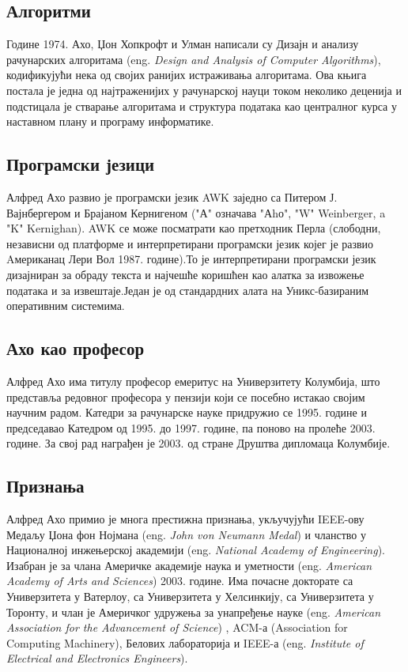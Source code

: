 \documentclass[a4paper]{article}
\begin{document}
\subsection{Алгоритми}
\label{subsec:podnaslov4}
Године 1974. Ахо, Џон Хопкрофт и Улман написали су Дизајн и анализу рачунарских алгоритама (eng. \emph{Design and Analysis of Computer Algorithms}), кодификујући нека од својих ранијих истраживања алгоритама. Ова књига постала је једна од најтраженијих у рачунарској науци током неколико деценија и подстицала је стварање алгоритама и структура података као централног курса у наставном плану и програму информатике.


\subsection{Програмски језици}
\label{subsec:podnaslov5}
Алфред Ахо развио је програмски језик AWK заједно са Питером Ј. Вајнбергером и Брајаном Кернигеном ("А" означава "Аhо", "W" Weinberger, a "K" Kernighan). AWK се може посматрати као претходник Перла (слободни, независни од платформе и интерпретирани програмски језик којег је развио Aмериканац Лери Вол 1987. године).То је интерпретирани програмски језик дизајниран за обраду текста и најчешће коришћен као алатка за извожење података и за извештаје.Један је од стандардних алата на Уникс-базираним оперативним системима.

\subsection{Ахо као професор}
\label{subsec:podnaslov6}
Алфред Ахо има титулу професор емеритус на Универзитету Колумбија, што представља редовног професора у пензији који се посебно истакао својим научним радом. Катедри за рачунарске науке придружио се 1995. године и председавао Катедром од 1995. до 1997. године, па поново на пролеће 2003. године. За свој рад награђен је 2003. од стране Друштва дипломаца Колумбије. 

\subsection{Признања}
\label{subsec:podnaslov7}
Алфред Ахо примио је многа престижна признања, укључујући IEEE-ову Медаљу Џона фон Нојмана (eng. \emph {John von Neumann Medal}) и чланство у Националној инжењерској академији (eng. \emph {National Academy of Engineering}). Изабран је за члана Америчке академије наука и уметности (eng. \emph {American Academy of Arts and Sciences}) 2003. године. Има почасне докторате са Универзитета у Ватерлоу, са Универзитета у Хелсинкију, са Универзитета у Торонту, и члан је Америчког удружења за унапређење науке (eng. \emph{American Association for the Advancement of Science}) , ACM-а (Association for Computing Machinery), Белових лабораторија и IEEE-а (eng. \emph {Institute of Electrical and Electronics Engineers}). 
\end{document}
